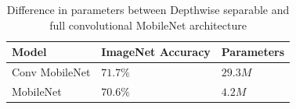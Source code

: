 \begin{table}[htbp]
\begin{center}
\begin{tabular}
{|p{120pt}|p{120pt}|p{120pt}|}
\hline
Model & ImageNet Accuracy & Parameters\\
\hline 
\hline Conv MobileNet & $71.7\%$ & $29.3M$ \\
\hline MobileNet & $70.6\%$ & $4.2M$ \\
\hline
\end{tabular}
\end{center}
\caption{Difference in parameters between Depthwise separable and full convolutional MobileNet architecture \cite{howard2017mobilenets}}
\label{MobileNetTable}
\end{table}



